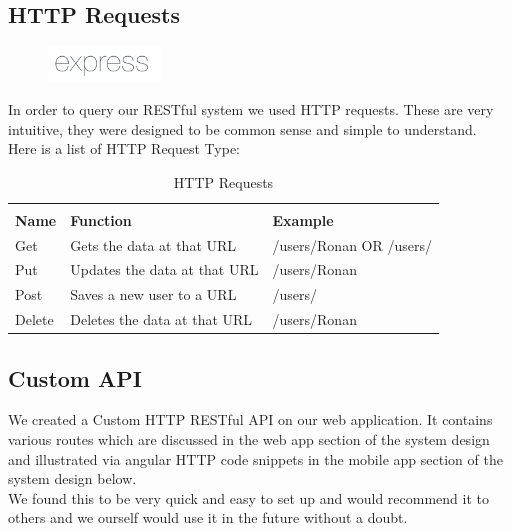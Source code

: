   
  \subsection{HTTP Requests}
  \begin{figure}
  	\includegraphics[width=3cm]{img/mobile-app/logos/express.png}
  \end{figure} 
  \cite{http_methods}
  In order to query our RESTful system we used HTTP requests.
  These are very intuitive, they were designed to be common sense and simple to understand.
  \\
  Here is a list of HTTP Request Type:
	    \begin{table}[H]
	    	\centering
	    	\begin{tabular}{x{2cm}p{6cm}p{6cm}}
	    		\toprule \\
	    		\textbf{Name} & \textbf{Function} & \textbf{Example} \\ \hline
	    		Get & Gets the data at that URL & /users/Ronan OR /users/ \\ \hline
	    		Put & Updates the data at that URL & /users/Ronan \\ \hline
	    		Post & Saves a new user to a URL & /users/ \\ \hline
	    		Delete & Deletes the data at that URL & /users/Ronan \\ \hline    			    	    		
	    		\bottomrule
	    	\end{tabular}
	    	\caption{HTTP Requests}
	    	\label{table:HttpRequests}
	    \end{table}
    
  \subsection{Custom API}
  We created a Custom HTTP RESTful API on our web application.
  It contains various routes which are discussed in the web app section of the system design and illustrated via angular HTTP code snippets in the mobile app section of the system design below.
  \\
  
  We found this to be very quick and easy to set up and would recommend it to others and we ourself would use it in the future without a doubt.
  
